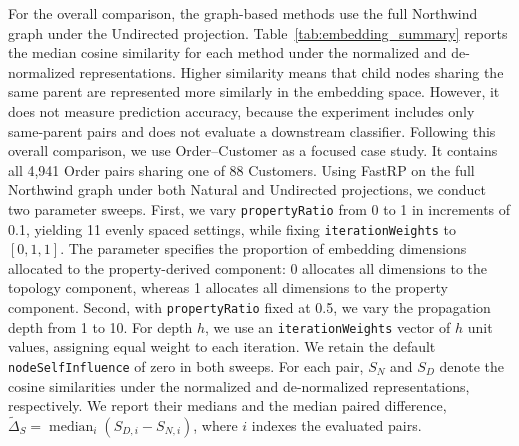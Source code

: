 \documentclass[sigconf]{acmart}
\begin{document}
For the overall comparison, the graph-based methods use the full Northwind
graph under the Undirected projection.
Table~\ref{tab:embedding_summary} reports the median cosine similarity
for each method under the normalized and de-normalized representations.
Higher similarity means that child nodes sharing the same parent
are represented more similarly in the embedding space. However, it does not measure
prediction accuracy, because the experiment includes only same-parent pairs and
does not evaluate a downstream classifier. Following this overall comparison,
we use Order--Customer as a focused case study. It contains all 4,941 Order pairs
sharing one of 88 Customers. Using FastRP on the full Northwind graph under
both Natural and Undirected projections, we conduct two parameter sweeps.
First, we vary \texttt{propertyRatio} from 0 to 1
in increments of 0.1, yielding 11 evenly spaced settings, while fixing
\texttt{iterationWeights} to $[0,1,1]$. The parameter specifies the proportion of
embedding dimensions allocated to the property-derived component: 0 allocates all
dimensions to the topology component, whereas 1 allocates all dimensions to the
property component. Second, with \texttt{propertyRatio} fixed at 0.5, we vary the
propagation depth from 1 to 10. For depth $h$, we use an \texttt{iterationWeights}
vector of $h$ unit values, assigning equal weight to each iteration. We retain
the default \texttt{nodeSelfInfluence} of zero in both sweeps. For each pair,
$S_N$ and $S_D$ denote the cosine similarities under the normalized and de-normalized
representations, respectively. We report their medians and the median paired
difference, $\widetilde{\Delta}_S =
\operatorname{median}_i(S_{D,i}-S_{N,i})$, where $i$ indexes the evaluated pairs.
\end{document}
